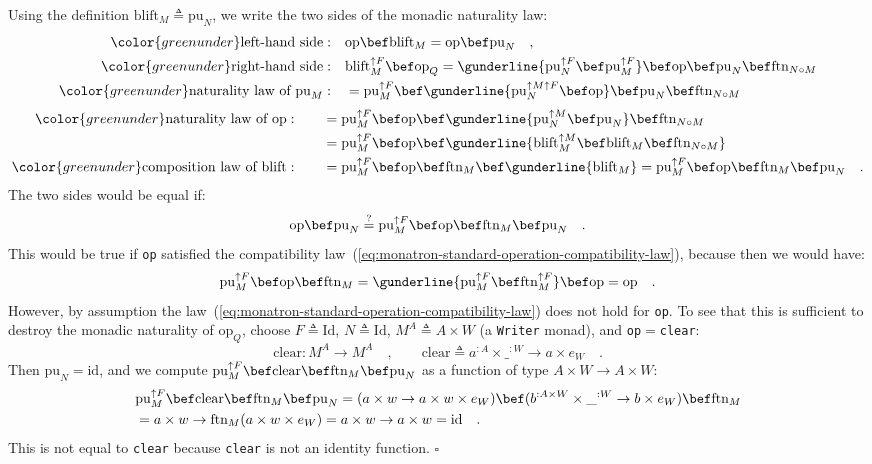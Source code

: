 Using the definition $\text{blift}_{M}\triangleq\text{pu}_{N}$, we
write the two sides of the monadic naturality law:
\begin{align*}
{\color{greenunder}\text{left-hand side}:}\quad & \text{op}\bef\text{blift}_{M}=\text{op}\bef\text{pu}_{N}\quad,\\
{\color{greenunder}\text{right-hand side}:}\quad & \text{blift}_{M}^{\uparrow F}\bef\text{op}_{Q}=\gunderline{\text{pu}_{N}^{\uparrow F}\bef\text{pu}_{M}^{\uparrow F}}\bef\text{op}\bef\text{pu}_{N}\bef\text{ftn}_{N\circ M}\\
{\color{greenunder}\text{naturality law of }\text{pu}_{M}:}\quad & =\text{pu}_{M}^{\uparrow F}\bef\gunderline{\text{pu}_{N}^{\uparrow M\uparrow F}\bef\text{op}}\bef\text{pu}_{N}\bef\text{ftn}_{N\circ M}
\end{align*}
\begin{align*}
{\color{greenunder}\text{naturality law of }\text{op}:}\quad & \quad=\text{pu}_{M}^{\uparrow F}\bef\text{op}\bef\gunderline{\text{pu}_{N}^{\uparrow M}\bef\text{pu}_{N}}\bef\text{ftn}_{N\circ M}\\
 & \quad=\text{pu}_{M}^{\uparrow F}\bef\text{op}\bef\gunderline{\text{blift}_{M}^{\uparrow M}\bef\text{blift}_{M}\bef\text{ftn}_{N\circ M}}\\
{\color{greenunder}\text{composition law of }\text{blift}:}\quad & \quad=\text{pu}_{M}^{\uparrow F}\bef\text{op}\bef\text{ftn}_{M}\bef\gunderline{\text{blift}_{M}}=\text{pu}_{M}^{\uparrow F}\bef\text{op}\bef\text{ftn}_{M}\bef\text{pu}_{N}\quad.
\end{align*}
The two sides would be equal if:
\[
\text{op}\bef\text{pu}_{N}\overset{?}{=}\text{pu}_{M}^{\uparrow F}\bef\text{op}\bef\text{ftn}_{M}\bef\text{pu}_{N}\quad.
\]
This would be true if \lstinline!op! satisfied the compatibility
law~(\ref{eq:monatron-standard-operation-compatibility-law}), because
then we would have:
\[
\text{pu}_{M}^{\uparrow F}\bef\text{op}\bef\text{ftn}_{M}=\gunderline{\text{pu}_{M}^{\uparrow F}\bef\text{ftn}_{M}^{\uparrow F}}\bef\text{op}=\text{op}\quad.
\]
However, by assumption the law~(\ref{eq:monatron-standard-operation-compatibility-law})
does not hold for \lstinline!op!. To see that this is sufficient
to destroy the monadic naturality of $\text{op}_{Q}$, choose $F\triangleq\text{Id}$,
$N\triangleq\text{Id}$, $M^{A}\triangleq A\times W$ (a \lstinline!Writer!
monad), and \lstinline!op!$=$\lstinline!clear!:
\[
\text{clear}:M^{A}\rightarrow M^{A}\quad,\quad\quad\text{clear}\triangleq a^{:A}\times\_^{:W}\rightarrow a\times e_{W}\quad.
\]
Then $\text{pu}_{N}=\text{id}$, and we compute $\text{pu}_{M}^{\uparrow F}\bef\text{clear}\bef\text{ftn}_{M}\bef\text{pu}_{N}$
as a function of type $A\times W\rightarrow A\times W$:
\begin{align*}
 & \text{pu}_{M}^{\uparrow F}\bef\text{clear}\bef\text{ftn}_{M}\bef\text{pu}_{N}=(a\times w\rightarrow a\times w\times e_{W})\bef(b^{:A\times W}\times\_^{:W}\rightarrow b\times e_{W})\bef\text{ftn}_{M}\\
 & =a\times w\rightarrow\text{ftn}_{M}(a\times w\times e_{W})=a\times w\rightarrow a\times w=\text{id}\quad.
\end{align*}
This is not equal to \lstinline!clear! because \lstinline!clear!
is not an identity function. $\square$

